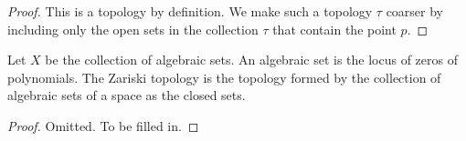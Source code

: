\begin{proof}
    This is a topology by definition.
    We make such a topology $\tau$ coarser by including only the open sets in the collection $\tau$ that contain the point $p$.
\end{proof}

\begin{example}
    \label{example-zariski}
    Let $X$ be the collection of algebraic sets.
    An algebraic set is the locus of zeros of polynomials.
    The Zariski topology is the topology formed by the collection of algebraic sets of a space as the closed sets.
\end{example}

\begin{proof}
    Omitted. To be filled in.
\end{proof}